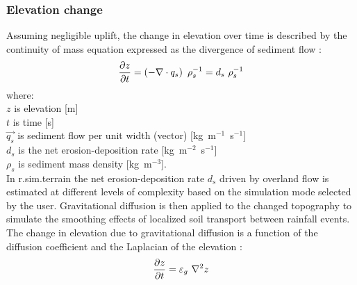 \documentclass[gmd, manuscript]{copernicus}
\begin{document}
\subsubsection{Elevation change} 
Assuming negligible uplift, the change in elevation over time 
is described by the continuity of mass equation 
expressed as the divergence of sediment flow  \citep{Tucker2001}:
\begin{equation}
\label{eq:evolution} 
{\partial z \over \partial t } = \left (-\nabla \cdot \vec{q_s} \right ) ~ \rho_s^{-1} = d_s ~ \rho_s^{-1} 
\end{equation}
{\small
where: \\
\noindent
\hspace*{0.5em} $z$ is elevation [\unit{m}] \\
\hspace*{0.5em} $t$ is time [\unit{s}] \\
\hspace*{0.5em} $\vec {q_s}$ is sediment flow per unit width (vector) [\unit{kg~m}$^{-1}$~\unit{s}$^{-1}$]\\
\hspace*{0.5em} $d_s$ is the net erosion-deposition rate [\unit{kg~m}$^{-2}$~\unit{s}$^{-1}$]\\
\hspace*{0.5em} $\rho_s$ is sediment mass density [\unit{kg~m}$^{-3}$].\\
}
In r.sim.terrain
the net erosion-deposition rate $d_s$ driven by overland flow
is estimated at different levels of complexity based 
on the simulation mode selected by the user.
Gravitational diffusion is then applied to the changed topography 
to simulate the smoothing effects 
of localized soil transport between rainfall events.
The change in elevation due to gravitational diffusion
is a function of the diffusion coefficient and the Laplacian of the elevation
\citep{Thaxton2004}:
\begin{equation}
\label{eq:grav_diffusion} 
{\partial z \over \partial t } =  \varepsilon_g ~ \nabla^2 z 
\end{equation}
\end{document}
